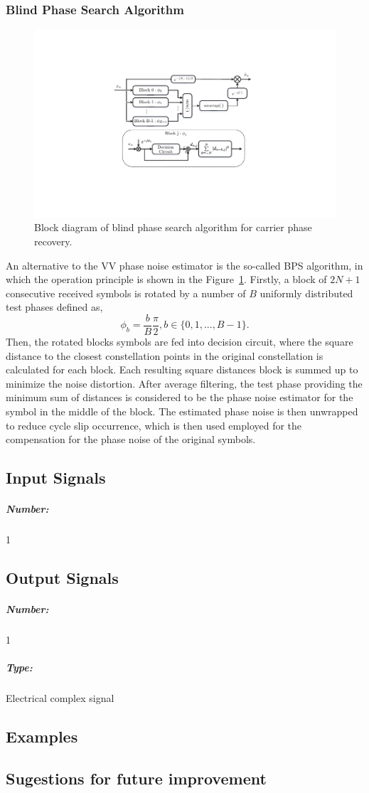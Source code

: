 \subsubsection{Blind Phase Search Algorithm}
\begin{figure}[h!]
    \centering
    \includegraphics[width=12cm]{./lib/carrier_phase_estimation/figures/bps_diagram.pdf}
    \caption{Block diagram of blind phase search algorithm for carrier phase recovery.}
    \label{fig_BPSdiagram}
\end{figure}
An alternative to the VV phase noise estimator is the so-called BPS algorithm, in which the operation principle is shown in the Figure~\ref{fig_BPSdiagram}. Firstly, a block of $2N+1$ consecutive received symbols is rotated by a number of $B$ uniformly distributed test phases defined as,
\begin{equation}
    	\phi_{b} = \frac{b}{B}\frac{\pi}{2}, b \in\{0,1,...,B-1\}.
    \label{eq_phaseNoise}
\end{equation}
Then, the rotated blocks symbols are fed into decision circuit, where the square distance to the closest constellation points in the original constellation is calculated for each block. Each resulting square distances block is summed up to minimize the noise distortion. After average filtering, the test phase providing the minimum sum of distances is considered to be the phase noise estimator for the symbol in the middle of the block. The estimated phase noise is then unwrapped to reduce cycle slip occurrence, which is then used employed for the compensation for the phase noise of the original symbols.

\pagebreak
\subsection*{Input Signals}

\subparagraph*{Number:} 1

\subsection*{Output Signals}

\subparagraph*{Number:} 1

\subparagraph*{Type:} Electrical complex signal

\subsection*{Examples}

\subsection*{Sugestions for future improvement}


